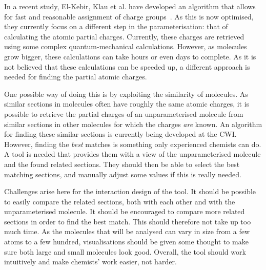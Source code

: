 In a recent study, El-Kebir, Klau et al. have developed an algorithm that allows for fast and reasonable assignment of charge groups~\cite{canzar2012charge}. As this is now optimised, they currently focus on a different step in the parameterisation: that of calculating the atomic partial charges. Currently, these charges are retrieved using some complex quantum-mechanical calculations. However, as molecules grow bigger, these calculations can take hours or even days to complete. As it is not believed that these calculations can be speeded up, a different approach is needed for finding the partial atomic charges.

One possible way of doing this is by exploiting the similarity of molecules. As similar sections in molecules often have roughly the same atomic charges, it is possible to retrieve the partial charges of an unparameterised molecule from similar sections in other molecules for which the charges \emph{are} known. An algorithm for finding these similar sections is currently being developed at the CWI. However, finding the \emph{best} matches is something only experienced chemists can do. A tool is needed that provides them with a view of the unparameterised molecule and the found related sections. They should then be able to select the best matching sections, and manually adjust some values if this is really needed.

Challenges arise here for the interaction design of the tool. It should be possible to easily compare the related sections, both with each other and with the unparameterised molecule. It should be encouraged to compare more related sections in order to find the best match. This should therefore not take up too much time. As the molecules that will be analysed can vary in size from a few atoms to a few hundred, visualisations should be given some thought to make sure both large and small molecules look good. Overall, the tool should work intuitively and make chemists' work easier, not harder.
